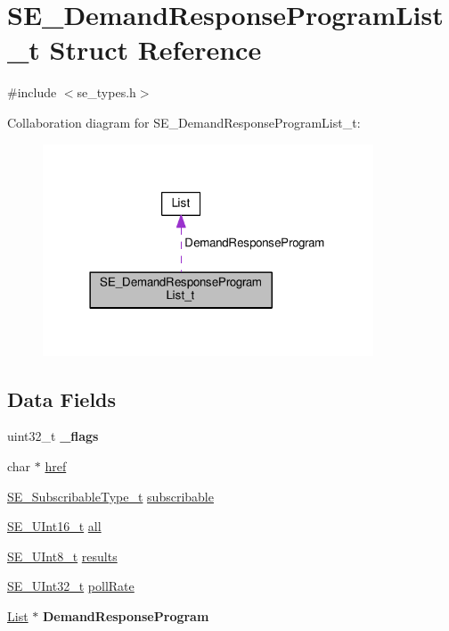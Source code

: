 \hypertarget{structSE__DemandResponseProgramList__t}{}\section{S\+E\+\_\+\+Demand\+Response\+Program\+List\+\_\+t Struct Reference}
\label{structSE__DemandResponseProgramList__t}


{\ttfamily \#include $<$se\+\_\+types.\+h$>$}



Collaboration diagram for S\+E\+\_\+\+Demand\+Response\+Program\+List\+\_\+t\+:\nopagebreak
\begin{figure}[H]
\begin{center}
\leavevmode
\includegraphics[width=278pt]{structSE__DemandResponseProgramList__t__coll__graph}
\end{center}
\end{figure}
\subsection*{Data Fields}
\begin{DoxyCompactItemize}
\item 
uint32\+\_\+t {\bfseries \+\_\+flags}
\item 
char $\ast$ \hyperlink{group__DemandResponseProgramList_ga5073e9c90f4f74248ce8bf5570136c3e}{href}
\item 
\hyperlink{group__SubscribableType_ga5c41f553d369710ed34619266bf2551e}{S\+E\+\_\+\+Subscribable\+Type\+\_\+t} \hyperlink{group__DemandResponseProgramList_ga8ae2eb55ac9951bd8d8e11644ff223f9}{subscribable}
\item 
\hyperlink{group__UInt16_gac68d541f189538bfd30cfaa712d20d29}{S\+E\+\_\+\+U\+Int16\+\_\+t} \hyperlink{group__DemandResponseProgramList_gac5e6faff00dcbcb67882031e92792075}{all}
\item 
\hyperlink{group__UInt8_gaf7c365a1acfe204e3a67c16ed44572f5}{S\+E\+\_\+\+U\+Int8\+\_\+t} \hyperlink{group__DemandResponseProgramList_ga34ad081aa336bdce426fe32f9f22d573}{results}
\item 
\hyperlink{group__UInt32_ga70bd4ecda3c0c85d20779d685a270cdb}{S\+E\+\_\+\+U\+Int32\+\_\+t} \hyperlink{group__DemandResponseProgramList_ga87aca3a2601d33694d6bcc8d0ec3bdc6}{poll\+Rate}
\item 
\hyperlink{structList}{List} $\ast$ {\bfseries Demand\+Response\+Program}
\end{DoxyCompactItemize}


